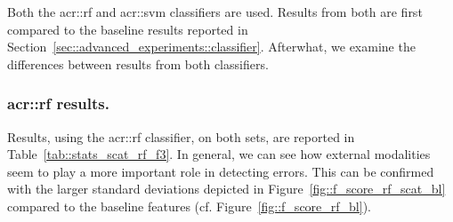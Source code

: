         Both the \gls{acr::rf} and \gls{acr::svm} classifiers are used.
        Results from both are first compared to the baseline results reported in Section~\ref{sec::advanced_experiments::classifier}.
        Afterwhat, we examine the differences between results from both classifiers.

        \subsubsection{\texorpdfstring{\acrshort*{acr::rf}}{RF} results.}
            \label{subsubsec::advanced_experiments::better_features::scatnet_baseline::rf}
            Results, using the \gls{acr::rf} classifier, on both sets, are reported in Table~\ref{tab::stats_scat_rf_f3}.
            In general, we can see how external modalities seem to play a more important role in detecting errors.
            This can be confirmed with the larger standard deviations depicted in Figure~\ref{fig::f_score_rf_scat_bl} compared to the baseline features (cf. Figure~\ref{fig::f_score_rf_bl}).\\

